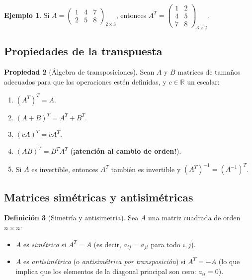 \documentclass[11pt,letterpaper]{article}
\theoremstyle{definition}
\newtheorem{definicion}{Definición}[section]
\newtheorem{ejemplo}[definicion]{Ejemplo}
\newtheorem{propiedad}[definicion]{Propiedad}
\theoremstyle{plain}
\newcommand{\R}{\mathbb{R}}
\begin{document}
\begin{ejemplo}
Si $A = \begin{pmatrix} 1 & 4 & 7 \\ 2 & 5 & 8 \end{pmatrix}_{2\times 3}$, entonces
$A^T = \begin{pmatrix} 1 & 2 \\ 4 & 5 \\ 7 & 8 \end{pmatrix}_{3\times 2}$.
\end{ejemplo}

\subsection{Propiedades de la transpuesta}

\begin{propiedad}[Álgebra de transposiciones]
Sean $A$ y $B$ matrices de tamaños adecuados para que las operaciones estén definidas, y $c \in \R$ un escalar:
\begin{enumerate}[label=(\roman*)]
  \item $(A^T)^T = A$.
  \item $(A + B)^T = A^T + B^T$.
  \item $(c A)^T = c A^T$.
  \item $(AB)^T = B^T A^T$ \quad (\textbf{¡atención al cambio de orden!}).
  \item Si $A$ es invertible, entonces $A^T$ también es invertible y $(A^T)^{-1} = (A^{-1})^T$.
\end{enumerate}
\end{propiedad}

\subsection{Matrices simétricas y antisimétricas}

\begin{definicion}[Simetría y antisimetría]
Sea $A$ una matriz cuadrada de orden $n\times n$:
\begin{itemize}
  \item $A$ es \emph{simétrica} si $A^T = A$ (es decir, $a_{ij} = a_{ji}$ para todo $i,j$).
  \item $A$ es \emph{antisimétrica} (o \emph{antisimétrica por transposición}) si $A^T = -A$
        (lo que implica que los elementos de la diagonal principal son cero: $a_{ii} = 0$).
\end{itemize}
\end{definicion}
\end{document}
